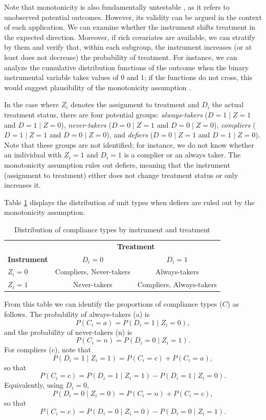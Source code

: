 Note that monotonicity is also fundamentally untestable \cite{imbens1994identification}, as it refers to unobserved potential outcomes. However, its validity can be argued in the context of each application. We can examine whether the instrument shifts treatment in the expected direction. Moreover, if rich covariates are available, we can stratify by them and verify that, within each subgroup, the instrument increases (or at least does not decrease) the probability of treatment. For instance, we can analyze the cumulative distribution functions of the outcome when the binary instrumental variable takes values of 0 and 1; if the functions do not cross, this would suggest plausibility of the monotonicity assumption \cite{RamirezHassan2023}.

In the case where $Z_i$ denotes the assignment to treatment and $D_i$ the actual treatment status, there are four potential groups: \textit{always-takers} ($D = 1 \mid Z = 1$ and $D = 1 \mid Z = 0$), \textit{never-takers} ($D = 0 \mid Z = 1$ and $D = 0 \mid Z = 0$), \textit{compliers} ($D = 1 \mid Z = 1$ and $D = 0 \mid Z = 0$), and \textit{defiers} ($D = 0 \mid Z = 1$ and $D = 1 \mid Z = 0$). Note that these groups are not identified; for instance, we do not know whether an individual with $Z_i = 1$ and $D_i = 1$ is a complier or an always taker. The monotonicity assumption rules out defiers, meaning that the instrument (assignment to treatment) either does not change treatment status or only increases it.

Table \ref{tab:2x2} displays the distribution of unit types when defiers are ruled out by the monotonicity assumption. 

\begin{table}[ht]
	\centering
	\caption{Distribution of compliance types by instrument and treatment}\label{tab:2x2}
	\begin{tabular}{lcc}
		\hline
		& \multicolumn{2}{c}{\textbf{Treatment}} \\ 
		\cline{2-3}
		\textbf{Instrument} & $D_i = 0$ & $D_i = 1$ \\ 
		\hline
		$Z_i=0$  & Compliers, Never-takers & Always-takers \\[0.25em]
		$Z_i=1$  & Never-takers & Compliers, Always-takers \\ 
		\hline
	\end{tabular}
\end{table}

From this table we can identify the proportions of compliance types ($C$) as follows. The probability of always-takers (a) is
\[
P(C_i = a) = P(D_i=1 \mid Z_i=0),
\]
and the probability of never-takers (n) is
\[
P(C_i = n) = P(D_i=0 \mid Z_i=1).
\]
For compliers (c), note that
\[
P(D_i=1 \mid Z_i=1) = P(C_i=c) + P(C_i=a),
\]
so that
\[
P(C_i = c) = P(D_i=1 \mid Z_i=1) - P(D_i=1 \mid Z_i=0).
\]
Equivalently, using $D_i=0$,
\[
P(D_i=0 \mid Z_i=0) = P(C_i=n) + P(C_i=c),
\]
so that
\[
P(C_i = c) = P(D_i=0 \mid Z_i=0) - P(D_i=0 \mid Z_i=1).
\]

